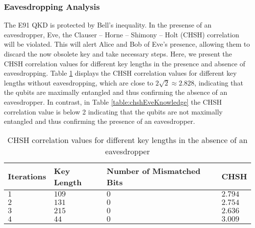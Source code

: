 \documentclass{article}
\begin{document}
\subsubsection{Eavesdropping Analysis}
The E91 QKD is protected by Bell's inequality. In the presense of an eavesdropper, Eve, the Clauser -- Horne -- Shimony -- Holt (CHSH) correlation \cite{PhysRevLett.23.880} will be violated. This will alert Alice and Bob of Eve's presence, allowing them to discard the now obsolete key and take necessary steps. Here, we present the CHSH correlation values for different key lengths in the presence and absence of eavesdropping. Table \ref{table:chsheRsults} displays the CHSH correlation values for different key lengths without eavesdropping, which are close to $2\sqrt{2} \approx 2.828$, indicating that the qubits are maximally entangled and thus confirming the absence of an eavesdropper. In contrast, in Table \ref{table:chshEveKnowledge} the CHSH correlation value is below 2 indicating that the qubits are not maximally entangled and thus confirming the presence of an eavesdropper.
\begin{table}[!h]
    \begin{center}
        \caption{CHSH correlation values for different key lengths in the absence of an eavesdropper}
        \begin{tabularx}{\textwidth}{>{\centering\arraybackslash}X>{\centering\arraybackslash}X>{\centering\arraybackslash}X>{\centering\arraybackslash}X}
            \hline
            Iterations & Key Length & Number of Mismatched Bits & CHSH    \\ \hline
            $1$        & $109$      & $0$                       & $2.794$ \\
            $2$        & $131$      & $0$                       & $2.754$ \\
            $3$        & $215$      & $0$                       & $2.636$ \\
            $4$        & $44$       & $0$                       & $3.009$ \\
            \hline
        \end{tabularx}
        \label{table:chsheRsults}
    \end{center}
\end{table}
\end{document}
